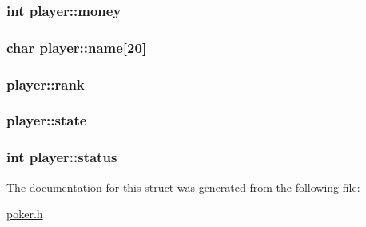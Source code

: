 \hypertarget{structplayer_af29ec89834ba3675a99b4008b10422f2}{
\subsubsection[{money}]{\setlength{\rightskip}{0pt plus 5cm}int player\+::money}}\label{structplayer_af29ec89834ba3675a99b4008b10422f2}
\hypertarget{structplayer_a17d232d762df3060c9db525fbf90bb06}{
\subsubsection[{name}]{\setlength{\rightskip}{0pt plus 5cm}char player\+::name\mbox{[}20\mbox{]}}}\label{structplayer_a17d232d762df3060c9db525fbf90bb06}
\hypertarget{structplayer_a9cfae91cf808c1b7518f48508865b29f}{
\subsubsection[{rank}]{ player\+::rank}}\label{structplayer_a9cfae91cf808c1b7518f48508865b29f}
\hypertarget{structplayer_ac23f62455d34a7b5d841b7e93284ee14}{
\subsubsection[{state}]{ player\+::state}}\label{structplayer_ac23f62455d34a7b5d841b7e93284ee14}
\hypertarget{structplayer_a79aedffc8c59ba13e1b882d3066fd8a9}{
\subsubsection[{status}]{\setlength{\rightskip}{0pt plus 5cm}int player\+::status}}\label{structplayer_a79aedffc8c59ba13e1b882d3066fd8a9}


The documentation for this struct was generated from the following file\+:\begin{DoxyCompactItemize}
\item 
\hyperlink{poker_8h}{poker.\+h}\end{DoxyCompactItemize}
